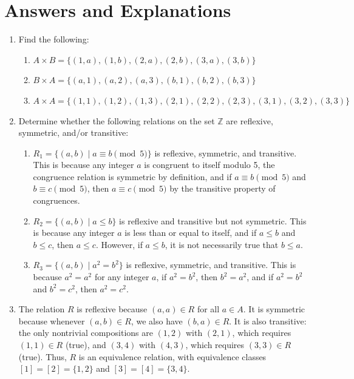 \section*{Answers and Explanations}

\begin{enumerate}
\item
Find the following:

\begin{enumerate}
    \item $A \times B = \{(1, a), (1, b), (2, a), (2, b), (3, a), (3, b)\}$
    \item $B \times A = \{(a, 1), (a, 2), (a, 3), (b, 1), (b, 2), (b, 3)\}$
    \item $A \times A = \{(1, 1), (1, 2), (1, 3), (2, 1), (2, 2), (2, 3), (3, 1), (3, 2), (3, 3)\}$
\end{enumerate}

\item
Determine whether the following relations on the set $\mathbb{Z}$ are reflexive, symmetric, and/or transitive:

\begin{enumerate}
    \item $R_1 = \{(a, b) \mid a \equiv b \pmod{5}\}$ is reflexive, symmetric, and transitive. This is because any integer $a$ is congruent to itself modulo 5, the congruence relation is symmetric by definition, and if $a \equiv b \pmod{5}$ and $b \equiv c \pmod{5}$, then $a \equiv c \pmod{5}$ by the transitive property of congruences.
    \item $R_2 = \{(a, b) \mid a \leq b\}$ is reflexive and transitive but not symmetric. This is because any integer $a$ is less than or equal to itself, and if $a \leq b$ and $b \leq c$, then $a \leq c$. However, if $a \leq b$, it is not necessarily true that $b \leq a$.
    \item $R_3 = \{(a, b) \mid a^2 = b^2\}$ is reflexive, symmetric, and transitive. This is because $a^2 = a^2$ for any integer $a$, if $a^2 = b^2$, then $b^2 = a^2$, and if $a^2 = b^2$ and $b^2 = c^2$, then $a^2 = c^2$.
\end{enumerate}

\item
The relation $R$ is reflexive because $(a, a) \in R$ for all $a \in A$. It is symmetric because whenever $(a, b) \in R$, we also have $(b, a) \in R$. It is also transitive: the only nontrivial compositions are $(1,2)$ with $(2,1)$, which requires $(1,1) \in R$ (true), and $(3,4)$ with $(4,3)$, which requires $(3,3) \in R$ (true). Thus, $R$ is an equivalence relation, with equivalence classes $[1] = [2] = \{1, 2\}$ and $[3] = [4] = \{3, 4\}$.


\end{enumerate}
